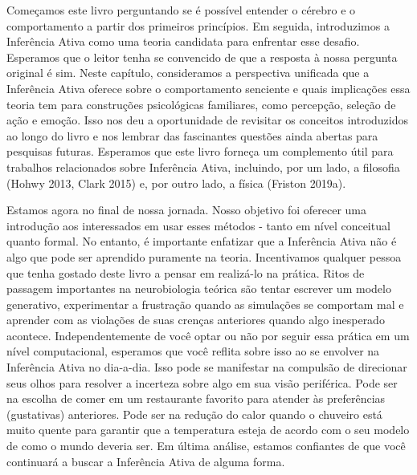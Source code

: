 \documentclass[
  12pt,
]{book}
\begin{document}
Começamos este livro perguntando se é possível entender o cérebro e o comportamento a partir dos primeiros princípios. Em seguida, introduzimos a Inferência Ativa como uma teoria candidata para enfrentar esse desafio. Esperamos que o leitor tenha se convencido de que a resposta à nossa pergunta original é sim. Neste capítulo, consideramos a perspectiva unificada que a Inferência Ativa oferece sobre o comportamento senciente e quais implicações essa teoria tem para construções psicológicas familiares, como percepção, seleção de ação e emoção. Isso nos deu a oportunidade de revisitar os conceitos introduzidos ao longo do livro e nos lembrar das fascinantes questões ainda abertas para pesquisas futuras. Esperamos que este livro forneça um complemento útil para trabalhos relacionados sobre Inferência Ativa, incluindo, por um lado, a filosofia (Hohwy 2013, Clark 2015) e, por outro lado, a física (Friston 2019a).

Estamos agora no final de nossa jornada. Nosso objetivo foi oferecer uma introdução aos interessados \hspace{0pt}\hspace{0pt}em usar esses métodos - tanto em nível conceitual quanto formal. No entanto, é importante enfatizar que a Inferência Ativa não é algo que pode ser aprendido puramente na teoria. Incentivamos qualquer pessoa que tenha gostado deste livro a pensar em realizá-lo na prática. Ritos de passagem importantes na neurobiologia teórica são tentar escrever um modelo generativo, experimentar a frustração quando as simulações se comportam mal e aprender com as violações de suas crenças anteriores quando algo inesperado acontece. Independentemente de você optar ou não por seguir essa prática em um nível computacional, esperamos que você reflita sobre isso ao se envolver na Inferência Ativa no dia-a-dia. Isso pode se manifestar na compulsão de direcionar seus olhos para resolver a incerteza sobre algo em sua visão periférica. Pode ser na escolha de comer em um restaurante favorito para atender às preferências (gustativas) anteriores. Pode ser na redução do calor quando o chuveiro está muito quente para garantir que a temperatura esteja de acordo com o seu modelo de como o mundo deveria ser. Em última análise, estamos confiantes de que você continuará a buscar a Inferência Ativa de alguma forma.

\cleardoublepage

\renewcommand{\[}{\begin{equation}}
\renewcommand{\]}{\end{equation}}
\end{document}
